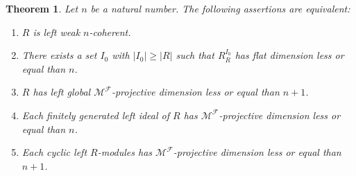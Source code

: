 \documentclass[a4paper,10pt]{amsart}
\newtheorem{theorem}[definition]{Theorem}
\begin{document}
\begin{theorem}\label{t:ProdsOfFiniteFlats}
  Let $n$ be a natural number. The following assertions are equivalent:
  \begin{enumerate}
  \item $R$ is left weak $n$-coherent.

  \item There exists a set $I_0$ with $|I_0| \geq |R|$ such that
    $R_R^{I_0}$ has flat dimension less or equal than $n$.

  \item $R$ has left global $\mathcal M^{\mathcal F}$-projective
    dimension less or equal than $n+1$.

  \item Each finitely generated left ideal of $R$ has $\mathcal M^{\mathcal
      F}$-projective dimension less or equal than $n$.

  \item Each cyclic left $R$-modules has $\mathcal M^{\mathcal
      F}$-projective dimension less or equal than $n+1$.
  \end{enumerate}
\end{theorem}
\end{document}

